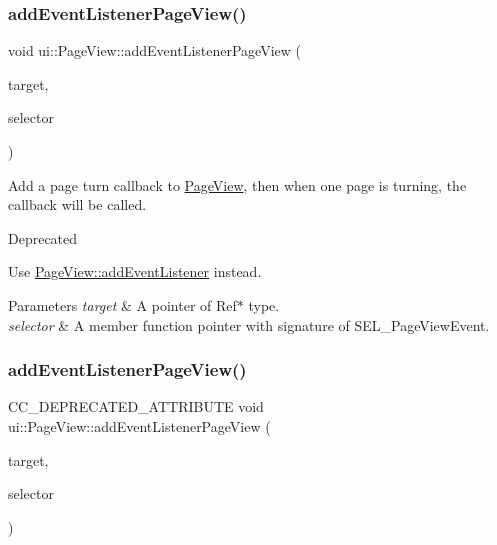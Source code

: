 \subsubsection{\texorpdfstring{add\+Event\+Listener\+Page\+View()}{addEventListenerPageView()}\hspace{0.1cm}{\footnotesize\ttfamily [1/2]}}
{\footnotesize\ttfamily void ui\+::\+Page\+View\+::add\+Event\+Listener\+Page\+View (\begin{DoxyParamCaption}\item[{\hyperlink{classRef}{Ref} $\ast$}]{target,  }\item[{S\+E\+L\+\_\+\+Page\+View\+Event}]{selector }\end{DoxyParamCaption})}

Add a page turn callback to \hyperlink{classui_1_1PageView}{Page\+View}, then when one page is turning, the callback will be called. \begin{DoxyRefDesc}{Deprecated}
\item[\hyperlink{deprecated__deprecated000150}{Deprecated}]Use {\ttfamily \hyperlink{classui_1_1PageView_a8887593dc71c203af06f8043082d2de4}{Page\+View\+::add\+Event\+Listener}} instead. \end{DoxyRefDesc}

\begin{DoxyParams}{Parameters}
{\em target} & A pointer of {\ttfamily Ref$\ast$} type. \\
\hline
{\em selector} & A member function pointer with signature of {\ttfamily S\+E\+L\+\_\+\+Page\+View\+Event}. \\
\hline
\end{DoxyParams}
\mbox{\label{classui_1_1PageView_a557c9a1c9971084fa8ca9be4b19a2f4f}} 
\subsubsection{\texorpdfstring{add\+Event\+Listener\+Page\+View()}{addEventListenerPageView()}\hspace{0.1cm}{\footnotesize\ttfamily [2/2]}}
{\footnotesize\ttfamily C\+C\+\_\+\+D\+E\+P\+R\+E\+C\+A\+T\+E\+D\+\_\+\+A\+T\+T\+R\+I\+B\+U\+TE void ui\+::\+Page\+View\+::add\+Event\+Listener\+Page\+View (\begin{DoxyParamCaption}\item[{\hyperlink{classRef}{Ref} $\ast$}]{target,  }\item[{S\+E\+L\+\_\+\+Page\+View\+Event}]{selector }\end{DoxyParamCaption})}

